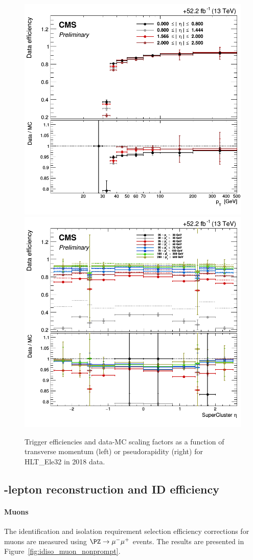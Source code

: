 \begin{figure}[h]
  \centering
  \includegraphics[width=.38\textwidth]{Figures/c6/efficiencies/trigger_electrons/2018/passEle32/leptonSF_SFvspT_passEle32.png}
\hspace{1cm}
  \includegraphics[width=.38\textwidth]{Figures/c6/efficiencies/trigger_electrons/2018/passEle32/leptonSF_SFvseta_passEle32.png}
  \caption{Trigger efficiencies and data-MC scaling factors as a function of transverse momentum (left) or pseudorapidity (right)
    for HLT\_Ele32 in 2018 data. }
  \label{fig:trigger_electrons}
\end{figure}

\subsection{\Displ-lepton reconstruction and ID efficiency} \label{sec:displeptoneff}
\paragraph{Muons}\label{sec:eff_disp_muon}
The identification and isolation requirement selection
efficiency corrections for \displ muons are measured
using $\PZ\to\mu^-\mu^+$ events. The results are presented
in Figure~\ref{fig:idiso_muon_nonprompt}. 

